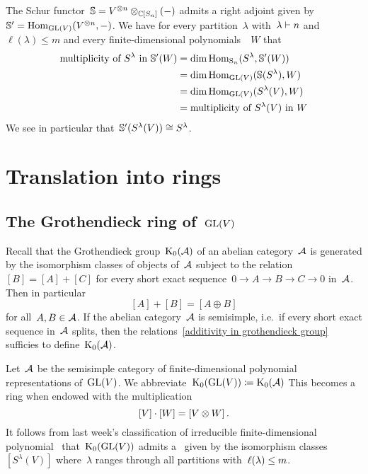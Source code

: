 \documentclass[a4paper,10pt]{scrartcl}
\begin{document}
\begin{remark}
  The Schur functor~$\mathbb{S} = V^{\otimes n} \otimes_{\mathbb{C}[S_n]} (-)$ admits a right adjoint given by~$\mathbb{S}' = \operatorname{Hom}_{\operatorname{GL}(V)}(V^{\otimes n}, -)$.
  We have for every partition~$\lambda$ with~$\lambda \vdash n$ and~$\ell(\lambda) \leq m$ and every finite-dimensional polynomials~{}~$W$ that
  \begin{align*}
    \text{multiplicity of~$S^\lambda$ in~$\mathbb{S}'(W)$}
    &=
    \dim \operatorname{Hom}_{\operatorname{S}_n}(S^\lambda, \mathbb{S}'(W))
    \\
    &=
    \dim \operatorname{Hom}_{\operatorname{GL}(V)}(\mathbb{S}(S^\lambda), W)
    \\
    &=
    \dim \operatorname{Hom}_{\operatorname{GL}(V)}(S^\lambda(V), W)
    \\
    &=
    \text{multiplicity of~$S^\lambda(V)$ in~$W$}
  \end{align*}
  We see in particular that~$\mathbb{S}'(S^\lambda(V)) \cong S^\lambda$.
\end{remark}





\section{Translation into rings}



\subsection{The Grothendieck ring of~$\operatorname{GL}(V)$}

Recall that the Grothendieck group~$\operatorname{K}_0(\mathcal{A})$ of an abelian category~$\mathcal{A}$ is generated by the isomorphism classes of objects of~$\mathcal{A}$ subject to the relation~$[B] = [A] + [C]$ for every short exact sequence~$0 \to A \to B \to C \to 0$ in~$\mathcal{A}$.
Then in particular
\begin{equation}
  \label{additivity in grothendieck group}
  [A] + [B] = [A \oplus B]
\end{equation}
for all~$A, B \in \mathcal{A}$.
If the abelian category~$\mathcal{A}$ is semisimple, i.e.\ if every short exact sequence in~$\mathcal{A}$ splits, then the relations~\eqref{additivity in grothendieck group} sufficies to define~$\operatorname{K}_0(\mathcal{A})$.

Let~$\mathcal{A}$ be the semisimple category of finite-dimensional polynomial representations of~$\operatorname{GL}(V)$.
We abbreviate~$\operatorname{K}_0(\operatorname{GL}(V)) \coloneqq \operatorname{K}_0(\mathcal{A})$
This becomes a ring when endowed with the multiplication
\[
  [V] \cdot [W]
  =
  [V \otimes W] \,.
\]
It follows from last week’s classification of irreducible finite-dimensional polynomial~{} that~$\operatorname{K}_0(\operatorname{GL}(V))$ admits a~{\basis{$\Integer$}} given by the isomorphism classes~$[S^\lambda(V)]$ where~$\lambda$ ranges through all partitions with~$\operatorname{\ell}(\lambda) \leq m$.
\end{document}
